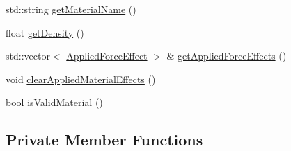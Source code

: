\begin{DoxyCompactItemize}
std\+::string \mbox{\hyperlink{class_material_a6259941981c91ac2f0c0baa0dd53c160}{get\+Material\+Name}} ()
\item 
float \mbox{\hyperlink{class_material_a40740dabb21cc8ba24b168935e10b06f}{get\+Density}} ()
\item 
std\+::vector$<$ \mbox{\hyperlink{struct_applied_force_effect}{Applied\+Force\+Effect}} $>$ \& \mbox{\hyperlink{class_material_ad443d451fe4f333fa2bd56f11937ebb0}{get\+Applied\+Force\+Effects}} ()
\item 
void \mbox{\hyperlink{class_material_a0f4cc73a9bb915e5739d14870b970b51}{clear\+Applied\+Material\+Effects}} ()
\item 
bool \mbox{\hyperlink{class_material_a5701802cfadd1ded2f934f15b3f018c9}{is\+Valid\+Material}} ()
\end{DoxyCompactItemize}
\subsection*{Private Member Functions}
